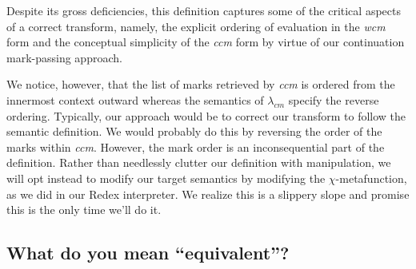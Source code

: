 \documentclass[ms,electronic,twosidetoc,letterpaper,chaptercenter,parttop]{byumsphd}
\begin{document}
Despite its gross deficiencies, this definition captures some of the critical aspects of a
correct transform, namely, the explicit ordering of evaluation in the \emph{wcm} form and
the conceptual simplicity of the \emph{ccm} form by virtue of our continuation
mark-passing approach.

We notice, however, that the list of marks retrieved by \emph{ccm} is ordered from the
innermost context outward whereas the semantics of $\lambda_{cm}$ specify the reverse
ordering. Typically, our approach would be to correct our transform to follow the semantic
definition. We would probably do this by reversing the order of the marks within
\emph{ccm}. However, the mark order is an inconsequential part of the definition. Rather
than needlessly clutter our definition with manipulation, we will opt instead to modify
our target semantics by modifying the $\chi$-metafunction, as we did in our Redex
interpreter. We realize this is a slippery slope and promise this is the only time we'll
do it.

\subsection{What do you mean ``equivalent''?}
\end{document}
